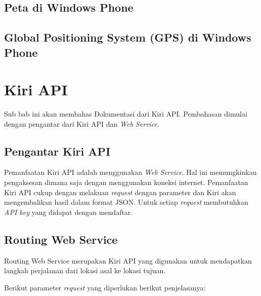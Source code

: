 \subsection{Peta di Windows Phone}
\label{subsec:Peta di Windows Phone}

\subsection{Global Positioning System (GPS) di Windows Phone}
\label{subsec:Global Positioning System (GPS) di Windows Phone}

\section{Kiri API}
\label{sec:Kiri API}
\hspace{0.5cm} Sub bab ini akan membahas Dokumentasi dari Kiri API. Pembahasan dimulai dengan pengantar dari Kiri API dan \textit{Web Service}.

\subsection{Pengantar Kiri API}
\label{subsec:Pengantar Kiri API}
\hspace{0.5cm} Pemanfaatan Kiri API adalah menggunakan \textit{Web Service}. Hal ini memungkinkan pengaksesan dimana saja dengan menggunakan koneksi internet. Pemanfaatan Kiri API cukup dengan melakuan \textit{request} dengan parameter dan Kiri akan mengembalikan hasil dalam format JSON. Untuk setiap \textit{request} membutuhkan \textit{API key} yang didapat dengan mendaftar\footnotemark[2]. 

\subsection{Routing Web Service}
\label{subsec:Routing Web Service}
\hspace{0.5cm} Routing Web Service merupakan Kiri API yang digunakan untuk mendapatkan langkah perjalanan dari lokasi asal ke lokasi tujuan.

Berikut parameter \textit{request} yang diperlukan berikut penjelasanya:

